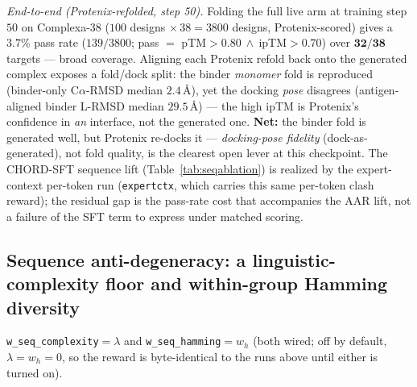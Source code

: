 \documentclass[11pt]{article}
\newcommand{\ttk}[1]{\texttt{\small #1}}
\begin{document}
\emph{End-to-end (Protenix-refolded, step 50).} Folding the full live arm at training step $50$ on
Complexa-38 ($100$ designs $\times\,38=3800$ designs, Protenix-scored) gives a $\mathbf{3.7\%}$ pass rate
($139/3800$; pass $=$ pTM$>\!0.80\ \wedge\ $ipTM$>\!0.70$) over $\mathbf{32/38}$ targets --- broad
coverage. Aligning each Protenix refold back onto the generated complex exposes a fold/dock split: the
binder \emph{monomer} fold is reproduced (binder-only C$\alpha$-RMSD median $2.4$\,\AA), yet the docking
\emph{pose} disagrees (antigen-aligned binder L-RMSD median $29.5$\,\AA) --- the high ipTM is Protenix's
confidence in \emph{an} interface, not the generated one. \textbf{Net:} the binder fold is generated well,
but Protenix re-docks it --- \emph{docking-pose fidelity} (dock-as-generated), not fold quality, is the
clearest open lever at this checkpoint. The CHORD-SFT sequence lift (Table~\ref{tab:seqablation}) is
realized by the expert-context per-token run (\ttk{expertctx}, which carries this same per-token clash
reward); the residual gap is the pass-rate cost that accompanies the AAR lift, not a failure of the SFT
term to express under matched scoring.

\subsection{Sequence anti-degeneracy: a linguistic-complexity floor and within-group Hamming diversity}
\label{sec:seqcomplex}
\ttk{w\_seq\_complexity}$=\lambda$ and \ttk{w\_seq\_hamming}$=w_h$ (both wired; off by default,
$\lambda{=}w_h{=}0$, so the reward is byte-identical to the runs above until either is turned on).
\end{document}
